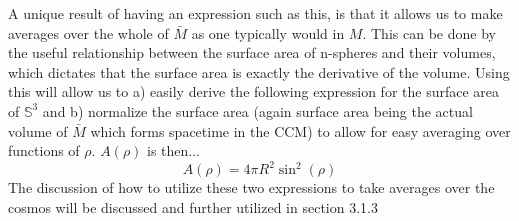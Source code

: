 \documentclass[a4paper]{article}
\begin{document}
    A unique result of having an expression such as this, is that it allows us
    to make averages over the whole of $\bar{M}$ as one typically would in
    $M$. This can be done by the useful relationship between the surface area
    of n-spheres and their volumes, which dictates that the surface area is
    exactly the derivative of the volume. Using this will allow us to a) easily
    derive the following expression for the surface area of $\mathbb{S}^3$ and
    b) normalize the surface area (again surface area being the actual volume
    of $\bar{M}$ which forms spacetime in the CCM) to allow for easy averaging
    over functions of $\rho$. $A(\rho)$ is then...
    \begin{equation}
        A(\rho) = 4 \pi R^2 \sin^2(\rho)
    \end{equation}
    The discussion of how to utilize these two expressions to take averages
    over the cosmos will be discussed and further utilized in section 3.1.3






\end{document}

